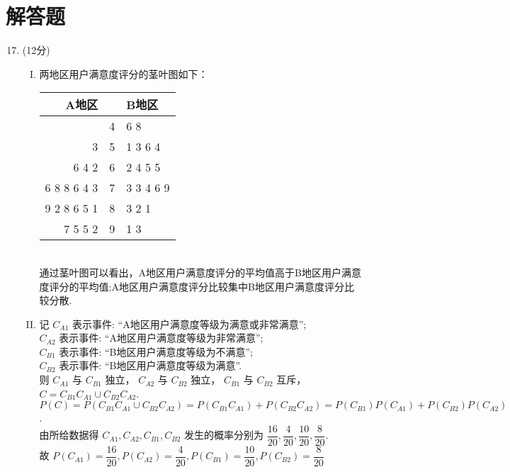\documentclass[11pt]{article}
\begin{document}
\section{\heiti 解答题}
\begin{enumerate}
	\setcounter{enumi}{16}
	\item (12分)
	\begin{enumerate}[(I)]
		\item 两地区用户满意度评分的茎叶图如下：\\
			\begin{tabular}{r|l|l}
				A地区 &   & B地区       \\ \hline
				\multicolumn{1}{l|}{}    & 4 & 6 8       \\
				3                        & 5 & 1 3 6 4   \\
				6 4 2                    & 6 & 2 4 5 5    \\
				6 8 8 6 4 3              & 7 & 3 3 4 6 9 \\
				9 2 8 6 5 1              & 8 & 3 2 1     \\
				7 5 5 2                  & 9 & 1 3     
			\end{tabular}
			\\通过茎叶图可以看出，A地区用户满意度评分的平均值高于B地区用户满意度评分的平均值;A地区用户满意度评分比较集中B地区用户满意度评分比较分散.
		\item 记 $C_{A 1}$ 表示事件: “A地区用户满意度等级为满意或非常满意”;
		\\$C_{A 2}$ 表示事件: “A地区用户满意度等级为非常满意”;
		\\$C_{B 1}$ 表示事件: “B地区用户满意度等级为不满意”;
		\\$C_{B 2}$ 表示事件: “B地区用户满意度等级为满意”.
		\\则 $C_{A 1}$ 与 $C_{B 1}$ 独立， $C_{A 2}$ 与 $C_{B 2}$ 独立， $C_{B 1}$ 与 $C_{B 2}$ 互斥， $C=C_{B 1} C_{A 1} \cup C_{B 2} C_{A 2}$.
		\\$P(C)=P\left(C_{B 1} C_{A 1} \cup C_{B 2} C_{A 2}\right)=P\left(C_{B 1} C_{A 1}\right)+P\left(C_{B 2} C_{A 2}\right)=P\left(C_{B 1}\right) P\left(C_{A 1}\right)+P\left(C_{B 2}\right) P\left(C_{A 2}\right)$.
		\\由所给数据得 $C_{A 1}, C_{A 2}, C_{B 1}, C_{B 2}$ 发生的概率分别为 $\dfrac{16}{20}, \dfrac{4}{20}, \dfrac{10}{20}, \dfrac{8}{20}$.
		\\故 $P\left(C_{A 1}\right)=\dfrac{16}{20}, P\left(C_{A 2}\right)=\dfrac{4}{20}, P\left(C_{B 1}\right)=\dfrac{10}{20}, P\left(C_{B 2}\right)=\dfrac{8}{20}$

\end{enumerate}
\end{enumerate}
\end{document}
